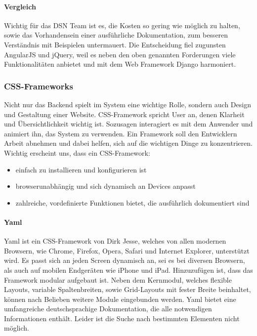 \paragraph{Vergleich}
Wichtig für das DSN Team ist es, die Kosten so gering wie möglich zu halten, sowie das Vorhandensein einer ausführliche Dokumentation, zum besseren Verständnis mit Beispielen untermauert. Die Entscheidung fiel zugunsten AngularJS und jQuery, weil es neben den oben genannten Forderungen viele Funktionalitäten anbietet und mit dem Web Framework Django harmoniert.

\subsubsection{CSS-Frameworks}
Nicht nur das Backend spielt im System eine wichtige Rolle, sondern auch Design und Gestaltung einer Website. CSS-Framework 
spricht User an, denen Klarheit und Übersichtlichkeit wichtig ist. Sozusagen interagiert es mit dem Anwender und animiert ihn, das System zu verwenden. Ein Framework soll den Entwicklern Arbeit abnehmen und dabei helfen, sich auf die wichtigen Dinge zu konzentrieren.\\
Wichtig erscheint uns, dass ein CSS-Framework:
\begin{itemize}
\item einfach zu installieren und konfigurieren ist
\item browserunabhängig und sich dynamisch an Devices anpasst
\item zahlreiche, vordefinierte Funktionen bietet, die ausführlich dokumentiert sind
\end{itemize}

\paragraph{Yaml}
Yaml ist ein CSS-Framework von Dirk Jesse, welches von allen modernen Browsern, wie Chrome, Firefox, Opera, Safari und Internet Explorer, unterstützt wird. Es passt sich an jeden Screen dynamisch an, sei es bei diversen Browsern, als auch auf mobilen Endgeräten wie iPhone und iPad. Hinzuzufügen ist, dass das Framework modular aufgebaut ist. Neben dem Kernmodul, welches flexible Layouts, variable Spaltenbreiten, sowie Grid-Layouts mit fester Breite beinhaltet, können nach Belieben weitere Module eingebunden werden. Yaml bietet eine umfangreiche deutschsprachige Dokumentation, die alle notwendigen Informationen enthält. Leider ist die Suche nach bestimmten Elementen nicht möglich. \cite{YAML}\\


